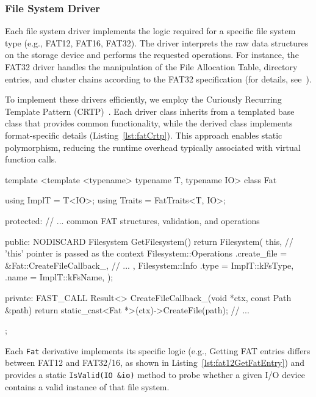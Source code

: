 \documentclass[a4paper,10pt,twoside]{report}
\theoremstyle{definition}
\begin{document}
\subsubsection{File System Driver}

Each file system driver implements the logic required for a specific file system type (e.g., FAT12, FAT16, FAT32). The driver interprets the raw data structures on the storage device and performs the requested operations. For instance, the FAT32 driver handles the manipulation of the File Allocation Table, directory entries, and cluster chains according to the FAT32 specification (for details, see~\cite{fat-spec}).

To implement these drivers efficiently, we employ the Curiously Recurring Template Pattern (CRTP)~\cite{crtp}. Each driver class inherits from a templated base class that provides common functionality, while the derived class implements format-specific details (Listing~\ref{lst:fatCrtp}). This approach enables static polymorphism, reducing the runtime overhead typically associated with virtual function calls.

\begin{cppcode}[caption={FAT Driver CRTP Base Class}, label={lst:fatCrtp}]
template <template <typename> typename T, typename IO>
class Fat
{
    using ImplT  = T<IO>;
    using Traits = FatTraits<T, IO>;

protected:
    // ... common FAT structures, validation, and operations

public:
    NODISCARD Filesystem GetFilesystem()
    {
        return Filesystem(
            this, // 'this' pointer is passed as the context
            Filesystem::Operations{
                .create_file = &Fat::CreateFileCallback_,
                // ...
            },
            Filesystem::Info{
                .type = ImplT::kFsType,
                .name = ImplT::kFsName,
            }
        );
    }

private:
    FAST_CALL Result<> CreateFileCallback_(void *ctx, const Path &path)
    {
        return static_cast<Fat *>(ctx)->CreateFile(path);
    }
    // ...
};
\end{cppcode}

Each \texttt{Fat} derivative implements its specific logic (e.g., Getting FAT entries differs between FAT12 and FAT32/16, as shown in Listing~\ref{lst:fat12GetFatEntry}) and provides a static \texttt{IsValid(IO \&io)} method to probe whether a given I/O device contains a valid instance of that file system.
\end{document}
